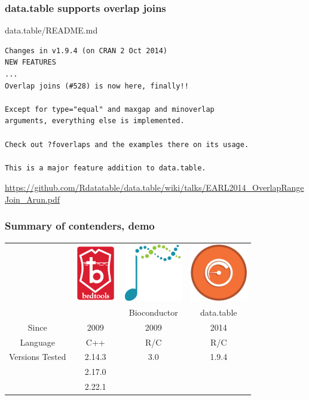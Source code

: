 \documentclass{beamer}
\begin{document}
  

\begin{frame}[fragile]
  \frametitle{data.table supports overlap joins}

data.table/README.md

\begin{verbatim}
Changes in v1.9.4 (on CRAN 2 Oct 2014)
NEW FEATURES
...
Overlap joins (#528) is now here, finally!! 

Except for type="equal" and maxgap and minoverlap 
arguments, everything else is implemented. 

Check out ?foverlaps and the examples there on its usage. 

This is a major feature addition to data.table.
\end{verbatim}

\alert{\url{https://github.com/Rdatatable/data.table/wiki/talks/EARL2014_OverlapRangeJoin_Arun.pdf}}

\end{frame}

\begin{frame}
  \frametitle{Summary of contenders, demo}
  
  \begin{tabular}{cccc}
    &
    \includegraphics[height=2.5cm]{bedtools} &
    \includegraphics[height=2.5cm]{bioconductor} &
    \includegraphics[height=2.5cm]{datatable} \\
    &  & Bioconductor & data.table \\
    \hline
    Since & 2009 & 2009 & 2014 \\
    Language & C++ & R/C & R/C \\
    Versions Tested & 2.14.3 & 3.0 & 1.9.4 \\
     & 2.17.0 \\
    & 2.22.1
  \end{tabular}
\end{frame}
\end{document}
